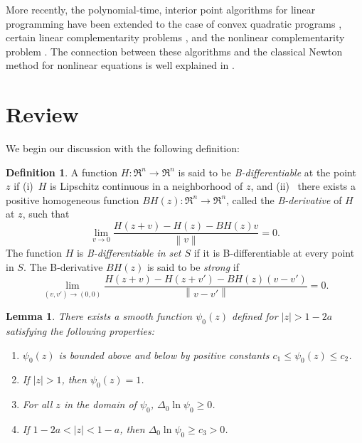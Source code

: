 \documentclass[manuscript, printscheme]{aomart}
\newtheorem[{}\it]{thm}{Theorem}[section]
\newtheorem{lem}[thm]{Lemma}
\theoremstyle{definition}
\newtheorem{defn}{Definition}[section]
\newtheorem*[{}\it]{notation}{Notation}
\newcommand{\envert}[1]{\left\lvert#1\right\rvert}
\let\abs=\envert
\newcommand{\enVert}[1]{\left\lVert#1\right\rVert}
\begin{document}
More recently, the polynomial-time, interior point algorithms for linear
programming have been extended to the case of convex quadratic programs
\cite{moad:quadpro,ye:intalg}, certain linear complementarity problems
\cite{komiyo:lincomp,miyoki:lincomp}, and the nonlinear complementarity
problem \cite{komiyo:unipfunc}. The connection between these algorithms
and the classical Newton method for nonlinear equations is well
explained in \cite{komiyo:lincomp}.

\section{Review}
\label{computation}

We begin our discussion with the following definition:

\begin{defn}

A function $H\colon \Re^n \to \Re^n$ is said to be
\emph{B-differentiable} at the point $z$ if (i)~$H$ is Lipschitz
continuous in a neighborhood of $z$, and (ii)~ there exists a positive
homogeneous function $BH(z)\colon \Re^n \to \Re^n$, called the
\emph{B-derivative} of $H$ at $z$, such that
\[ \lim_{v \to 0} \frac{H(z+v) - H(z) - BH(z)v}{\enVert{v}} = 0. \]
The function $H$ is \textit{B-differentiable in set $S$} if it is
B-differentiable at every point in $S$. The B-derivative $BH(z)$ is said
to be \textit{strong} if
\[ \lim_{(v,v') \to (0,0)} \frac{H(z+v) - H(z+v') - BH(z)(v
 -v')}{\enVert{v - v'}} = 0. \]
\end{defn}


\begin{lem}\label{limbog} There exists a smooth function $\psi_0(z)$
defined for $\abs{z}>1-2a$ satisfying the following properties\textup{:}
\begin{enumerate}
\renewcommand{\labelenumi}{(\roman{enumi})}
\item $\psi_0(z)$ is bounded above and below by positive constants
$c_1\leq \psi_0(z)\leq c_2$.
\item If $\abs{z}>1$, then $\psi_0(z)=1$.
\item For all $z$ in the domain of $\psi_0$, $\Delta_0\ln \psi_0\geq 0$.
\item If $1-2a<\abs{z}<1-a$, then $\Delta_0\ln \psi_0\geq
c_3>0$.
\end{enumerate}
\end{lem}
\end{document}
